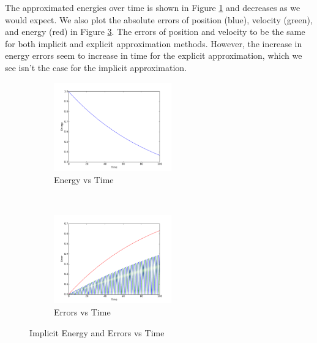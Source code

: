 \documentclass{article}
\begin{document}
\begin{enumerate}
	The approximated energies over time is shown in Figure \ref{fig:energy_i} and decreases as we would expect. We also plot the absolute errors of position (blue), velocity (green), and energy (red) in Figure \ref{fig:errors_i}. The errors of position and velocity to be the same for both implicit and explicit approximation methods. However, the increase in energy errors seem to increase in time for the explicit approximation, which we see isn't the case for the implicit approximation.
	\begin{figure}[ht!]
		\centering
		\begin{subfigure}{0.4\linewidth}
		\centering
		\includegraphics[width=2in]{energy_i.pdf}
		\caption{Energy vs Time}
		\label{fig:energy_i}
		\end{subfigure}
		~
		\begin{subfigure}{0.4\linewidth}
		\centering
		\includegraphics[width=2in]{energyerror_i.pdf}
		\caption{Errors vs Time}
		\label{fig:errors_i}
		\end{subfigure}
		
		\caption{Implicit Energy and Errors vs Time}
	\end{figure}
	
\end{enumerate}
\end{document}
